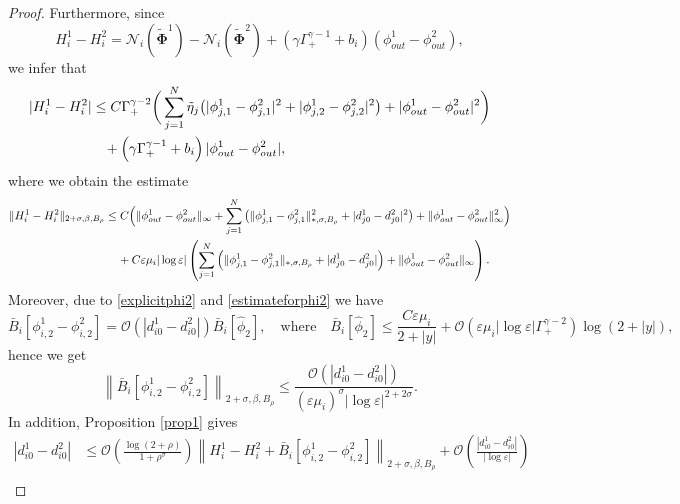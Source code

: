 \documentclass[11pt,reqno,a4paper]{amsart}
\numberwithin{equation}{section}
\newcommand{\ve}{\varepsilon}
\begin{document}
\begin{proof}
Furthermore, since 
\begin{equation*}
      H_i^1-H_i^2=\mathcal{N}_i\left(\widetilde{\mathbf{\Phi}}^1\right)-\mathcal{N}_i\left(\widetilde{\mathbf{\Phi}}^2\right)+ \left(\gamma\Gamma^{\gamma-1}_{+}+b_i\right)\left(\phi_{out}^{1}-\phi_{out}^{2}\right),
\end{equation*}
we infer that
\begin{equation*}
\begin{aligned}
|H_i^1-H_i^2|&\leq C\Gamma^{\gamma-2}_{+}\bigg(\sum_{j=1}^{N}\tilde{\eta}_j\big(|\phi_{j,1}^1-\phi_{j,1}^2|^2+|\phi_{j,2}^1-\phi_{j,2}^2|^2\big)+|\phi^1_{out}-\phi^2_{out}|^2\bigg)\\
&\hspace{3mm}+\left(\gamma\Gamma^{\gamma-1}_{+}
+b_i\right)|\phi^1_{out}-\phi^2_{out}|,
\end{aligned}
\end{equation*}
where we obtain the estimate
\begin{equation}\label{Esth1minush2}
\begin{aligned}
\|H_i^1-H_i^2\|_{2+\sigma,\beta,B_{\rho}}&\leq C \Big(\|\phi_{out}^1-\phi_{out}^2\|_{\infty}+\sum_{j=1}^{N}\big(\|\phi^{1}_{j,1}-\phi^{2}_{j,1}\|^2_{*,\sigma,B_{\rho}}+|d^{1}_{j0}-d^{2}_{j0}|^2\big)+\|\phi_{out}^1-\phi_{out}^2\|^2_{\infty}\Big)\\
&\hspace{4mm}+C\ve\mu_i|\log\ve|\left(\sum_{j=1}^{N}\Big(\|\phi^{1}_{j,1}-\phi^{2}_{j,1}\|_{*,\sigma,B_{\rho}}+|d^{1}_{j0}-d^{2}_{j0}|\Big)+\|\phi_{out}^1-\phi_{out}^2\|_{\infty}\right).
\end{aligned}
\end{equation}
Moreover, due to \eqref{explicitphi2} and \eqref{estimateforphi2} we have \[\bar{B}_i[\phi^{1}_{i,2}-\phi^{2}_{i,2}]=\mathcal{O}(|d^{1}_{i0}-d^{2}_{i0}|)\bar{B}_i[\hat{\phi}_2], \quad \mbox{where} \quad \bar{B}_i[\hat{\phi}_{2}]\leq \frac{C\ve\mu_i}{2+|y|}+\mathcal{O}\left(\ve\mu_i|\log\ve|\Gamma^{\gamma-2}_{+}\right)\log(2+|y|),\]
hence we get
\begin{equation}\label{estforBfinal}
\left\|\bar{B}_i[\phi^{1}_{i,2}-\phi^{2}_{i,2}]\right\|_{2+\sigma,\beta,B_{\rho}} \leq \frac{\mathcal{O}\left(|d_{i0}^1-d_{i0}^2|\right)}{(\ve\mu_i)^{\sigma}|\log\ve|^{2+2\sigma}}.
\end{equation}
In addition, Proposition \ref{prop1} gives
\begin{equation}\label{finalestimates1}
\begin{aligned}
    |d^{1}_{i0}-d^{2}_{i0}|&\leq \mathcal{O}\left(\frac{\log(2+\rho)}{1+\rho^{\sigma}}\right)\left\|H_i^1-H_i^2+\bar{B}_i[\phi^{1}_{i,2}-\phi^{2}_{i,2}]\right\|_{2+\sigma,\beta,B_{\rho}}+\mathcal{O}\left(\frac{|d_{i0}^1-d_{i0}^2|}{|\log\ve|}\right)\\

\end{aligned}
\end{equation}
\end{proof}
\end{document}
